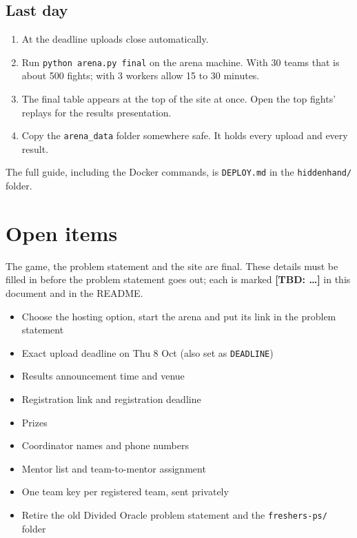 \documentclass[11pt,a4paper]{article}
\newcommand{\TBD}[1]{\textcolor{tbd}{\textbf{[TBD: #1]}}}
\newcommand{\code}[1]{\texttt{#1}}
\begin{document}
\subsection{Last day}

\begin{enumerate}
  \item At the deadline uploads close automatically.
  \item Run \code{python arena.py final} on the arena machine. With 30 teams that is about 500
        fights; with 3 workers allow 15 to 30 minutes.
  \item The final table appears at the top of the site at once. Open the top fights' replays
        for the results presentation.
  \item Copy the \code{arena\_data} folder somewhere safe. It holds every upload and every result.
\end{enumerate}

The full guide, including the Docker commands, is \code{DEPLOY.md} in the \code{hiddenhand/}
folder.

\section{Open items}\label{sec:open}

The game, the problem statement and the site are final. These details must be filled in before
the problem statement goes out; each is marked \TBD{\dots} in this document and in the README.

\begin{itemize}[label=$\square$]
  \item Choose the hosting option, start the arena and put its link in the problem statement
  \item Exact upload deadline on Thu 8 Oct (also set as \code{DEADLINE})
  \item Results announcement time and venue
  \item Registration link and registration deadline
  \item Prizes
  \item Coordinator names and phone numbers
  \item Mentor list and team-to-mentor assignment
  \item One team key per registered team, sent privately
  \item Retire the old Divided Oracle problem statement and the \code{freshers-ps/} folder
\end{itemize}
\end{document}

